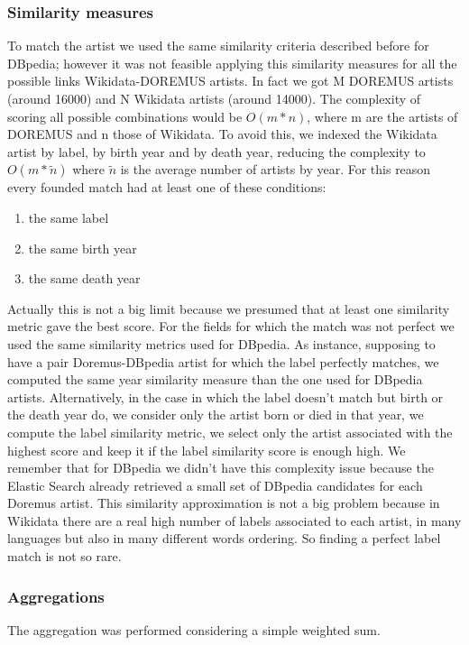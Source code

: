 \documentclass[paper=a4, fontsize=11pt]{scrartcl}
\begin{document}
\subsubsection{Similarity measures}
To match the artist we used the same similarity criteria described before for DBpedia; however it was not feasible applying this similarity measures for all the possible links Wikidata-DOREMUS artists. In fact we got M DOREMUS artists (around 16000)  and N Wikidata artists (around 14000). The complexity of scoring all possible combinations would be $O(m*n)$, where m are the artists of DOREMUS and n those of Wikidata. To avoid this, we indexed the Wikidata artist by label, by birth year and by death year, reducing the complexity to $O(m*\tilde{n})$ where $\tilde{n}$ is the average number of artists by year.
For this reason every founded match had at least one of these conditions: 
\begin{enumerate}
\item the same label
\item the same birth year
\item the same death year
\end{enumerate}
Actually this is not a big limit because we presumed that at least one similarity metric gave the best score.
For the fields for which the match was not perfect we used the same similarity metrics used for DBpedia.
As instance, supposing to have a pair Doremus-DBpedia artist for which the label perfectly matches, we computed the same year similarity measure than the one used for DBpedia artists. Alternatively, in the case in which the label doesn't match but birth or the death year do, we consider only the artist born or died in that year, we compute the label similarity metric, we select only the artist associated with the highest score and keep it if the label similarity score is enough high.
We remember that for DBpedia we didn't have this complexity issue because the Elastic Search already retrieved a small set of DBpedia candidates for each Doremus artist.
This similarity approximation is not a big problem because in Wikidata there are a real high number of labels associated to each artist, in many languages but also in many different words ordering. So finding a perfect label match is not so rare.

\subsubsection{Aggregations}
The aggregation was performed considering a simple weighted sum.
\end{document}
